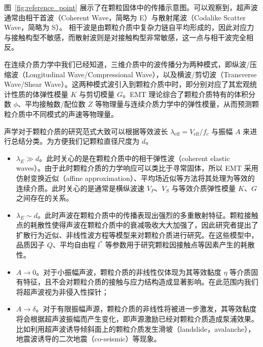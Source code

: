 图~\ref{fig:reference_point} 展示了在颗粒固体中的传播示意图。可以观察到，超声波通常由相干首波（Coherent Wave，简略为 E）与散射尾波（Codalike Scatter Wave，简略为 S）。 相干波是由颗粒介质中复杂力链自平均形成的，因此对应力与接触构型不敏感，而散射波则是对接触构型非常敏感，这一点与相干波完全相反\cite{PhysRevLett.93.154303}。

在连续介质力学中我们已经知道，三维介质中的波传播分为两种模式，即纵波/压缩波（Longitudinal Wave/Compressional Wave），以及横波/剪切波（Transverse Wave/Shear Wave）。这两种模式波引入到颗粒介质中时，即分别对应了其宏观统计性质的体弹性模量 $K$ 与剪切模量 $G$。EMT 理论综合了颗粒介质特有的体积分数 $\phi$、平均接触数/配位数 $Z$ 等物理量与连续介质力学中的弹性模量，从而预测颗粒介质中不同模式的声速等物理量。

声学对于颗粒介质的研究范式大致可以根据等效波长 $\lambda_{\text{eff}} = V_{\text{eff}}/f_{c}$ 与振幅 $A$ 来进行总结分类。为方便我们记颗粒直径尺度为 $d$。

\begin{itemize}
  \item $\lambda_{E}\gg d$。此时关心的是在颗粒介质中的相干弹性波（coherent elastic waves）。由于此时颗粒介质的力学响应可以类比于寻常固体，所以 EMT 采用仿射变换近似（affine approximation）、平均场近似等方法将其处理为等效的连续介质。此时关心的是通常是横纵波速 $V_{P}$、$V_{S}$ 与等效介质弹性模量 $K$、$G$ 之间存在的关系。
  \item $\lambda_{E}\sim d$。此时声波在颗粒介质中的传播表现出强烈的多重散射特征。颗粒接触点的耗散性使得声波在颗粒介质中的衰减吸收大大加强了，因此研究者提出了扩散行为近似\cite{PhysRevLett.93.154303}、非线性波方程\cite{Transitional,hamilton_nonlinear_1998}等模型来对颗粒介质进行研究。在这些模型中，品质因子 $Q$、平均自由程 $l^{*}$ 等参数用于研究颗粒因接触点等因素产生的耗散性。
  \item $A\rightarrow 0$。对于小振幅声波，颗粒介质的非线性仅体现为其等效黏度 $\eta$ 等介质固有特征，且不会对颗粒介质的接触与应力结构造成显著影响。在此范围内我们将超声波视为非侵入性探针；
  \item $A\rightarrow \delta$。对于有限振幅声源，颗粒介质的非线性将被进一步激发，其等效黏度将会根据超声波振幅而产生变化，即声源激励已经对颗粒介质造成泵浦效果。比如利用超声波诱导倾斜面上的颗粒介质发生滑坡（landslide，avalanche）\cite{PhysRevE.102.042901}，地震波诱导的二次地震（co-seismic）\cite{Johnson_2005}等现象。
\end{itemize}